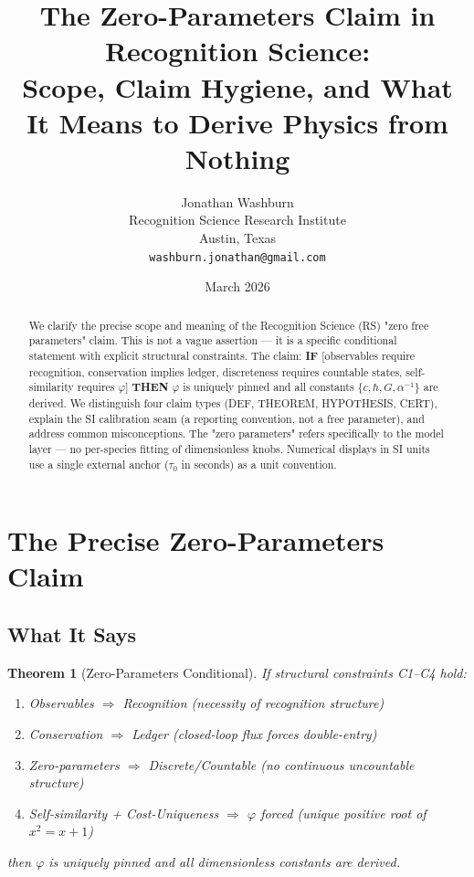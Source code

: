 \documentclass[12pt,a4paper]{article}
\title{The Zero-Parameters Claim in Recognition Science:\\
Scope, Claim Hygiene, and What It Means to Derive Physics from Nothing}
\author{Jonathan Washburn\\
Recognition Science Research Institute\\
Austin, Texas\\
\texttt{washburn.jonathan@gmail.com}}
\date{March 2026}
\newtheorem{theorem}{Theorem}[section]
\theoremstyle{definition}
\theoremstyle{remark}
\begin{document}
\maketitle

\begin{abstract}
We clarify the precise scope and meaning of the Recognition Science (RS) 
"zero free parameters" claim. This is not a vague assertion — it is a specific 
conditional statement with explicit structural constraints. The claim:
\textbf{IF} [observables require recognition, conservation implies ledger, 
discreteness requires countable states, self-similarity requires $\varphi$]
\textbf{THEN} $\varphi$ is uniquely pinned and all constants $\{c, \hbar, G, \alpha^{-1}\}$ 
are derived. We distinguish four claim types (DEF, THEOREM, HYPOTHESIS, CERT), 
explain the SI calibration seam (a reporting convention, not a free parameter), 
and address common misconceptions. The "zero parameters" refers specifically to 
the model layer — no per-species fitting of dimensionless knobs. Numerical displays 
in SI units use a single external anchor ($\tau_0$ in seconds) as a unit convention.
\end{abstract}

\section{The Precise Zero-Parameters Claim}

\subsection{What It Says}

\begin{theorem}[Zero-Parameters Conditional]
If structural constraints C1--C4 hold:
\begin{enumerate}[label=\textup{(C\arabic*)}]
\item Observables $\Rightarrow$ Recognition (necessity of recognition structure)
\item Conservation $\Rightarrow$ Ledger (closed-loop flux forces double-entry)
\item Zero-parameters $\Rightarrow$ Discrete/Countable (no continuous uncountable structure)
\item Self-similarity + Cost-Uniqueness $\Rightarrow$ $\varphi$ forced (unique positive root of $x^2 = x+1$)
\end{enumerate}
then $\varphi$ is uniquely pinned and all dimensionless constants are derived.
\end{theorem}
\end{document}
